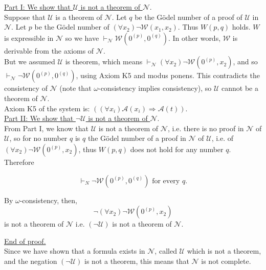 \underline{Part I: We show that $\mathcal{U}$ is not a theorem of $\mathcal{N}$}.\\
Suppose that $\mathcal{U}$ is a theorem of $\mathcal{N}$.  Let $q$ be the G\"odel number of a proof of $\mathcal{U}$ in $\mathcal{N}$.  Let $p$ be the G\"odel number of $(\forall x_{2}) \neg \mathcal{W}(x_{1}, x_{2})$.  Thus $W(p,q)$ holds.  $W$ is expressible in $\mathcal{N}$ so we have $\vdash_{\mathcal{N}} \mathcal{W}(0^{(p)}, 0^{(q)})$.  In other words, $\mathcal{W}$ is derivable from the axioms of $\mathcal{N}$.\\
But we assumed  $\mathcal{U}$ is theorem, which means $\vdash_{\mathcal{N}} (\forall x_{2}) \neg  \mathcal{W}(0^{(p)}, x_{2})$, and so $\vdash_{\mathcal{N}} \neg \mathcal{W}(0^{(p)}, 0^{(q)})$, using Axiom K5 and modus ponens.  This contradicts the consistency of $\mathcal{N}$ (note that $\omega$-consistency implies consistency), so $\mathcal{U}$ cannot be a theorem of $\mathcal{N}$.\\

Axiom K5 of the system is: $((\forall x_{i})\mathcal{A}(x_{i}) \Longrightarrow \mathcal{A}(t))$.\\ 

\underline{Part II: We show that $\neg \mathcal{U}$ is not a theorem of $\mathcal{N}$}.\\
From Part I, we know that $\mathcal{U}$ is not a theorem of $\mathcal{N}$, i.e. there is no proof in $\mathcal{N}$ of $\mathcal{U}$, so for no number $q$ is $q$ the G\"odel number of a proof in $\mathcal{N}$ of $\mathcal{U}$, i.e. of $(\forall x_{2}) \neg \mathcal{W}(0^{(p)}, x_{2})$, thus $W(p,q)$ does not hold for any number $q$.  Therefore 

\begin{displaymath}
\vdash_{N} \neg \mathcal{W}(0^{(p)}, 0^{(q)}) \text{ for every }q.
\end{displaymath}

By $\omega$-consistency, then,
\begin{displaymath}
\neg(\forall x_{2}) \neg \mathcal{W}(0^{(p)}, x_{2})
\end{displaymath}
is not a theorem of $\mathcal{N}$ i.e. $(\neg \mathcal{U})$ is not a theorem of $\mathcal{N}$.

\underline{End of proof.}\\

Since we have shown that a formula exists in $\mathcal{N}$, called $\mathcal{U}$ which is not a theorem, and the negation $(\neg \mathcal{U})$ is not a theorem, this means that $\mathcal{N}$ is not complete.\\

